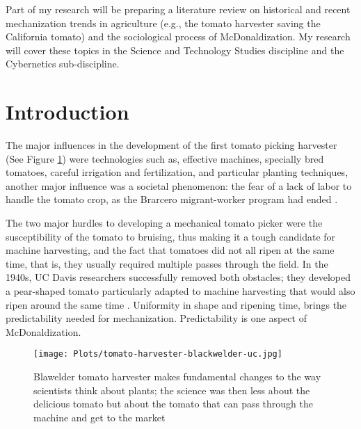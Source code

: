 Part of my research will be preparing a literature review on historical and recent mechanization trends in agriculture (e.g., the tomato harvester saving the California tomato) and the sociological process of McDonaldization. My research will cover these topics in the Science and Technology Studies discipline and the Cybernetics sub-discipline.

\section{Introduction} 
The major influences in the development of the first tomato picking harvester (See Figure \ref{fig:tomatoharvester}) were technologies such as, effective machines, specially bred tomatoes, careful irrigation and fertilization, and particular planting techniques, another major influence was a societal phenomenon: the fear of a lack of labor to handle the tomato crop, as the Brarcero migrant-worker program had ended \cite{rasmussen1968advances}. 

The two major hurdles to developing a mechanical tomato picker were the susceptibility of the tomato to bruising, thus making it a tough candidate for machine harvesting, and the fact that tomatoes did not all ripen at the same time, that is, they usually required multiple passes through the field. In the 1940s, UC Davis researchers successfully removed both obstacles; they developed a pear-shaped tomato particularly adapted to machine harvesting that would also ripen around the same time \cite{rasmussen1968advances}. Uniformity in shape and ripening time, brings the predictability needed for mechanization. Predictability is one aspect of McDonaldization. 


\begin{figure}[ht]
	\centering
	\texttt{[image: Plots/tomato-harvester-blackwelder-uc.jpg]}
	\caption{Blawelder tomato harvester makes fundamental changes to the way scientists think about plants; the science was then less about the delicious tomato but about the tomato that can pass through the machine and get to the market \protect{}} 
	\label{fig:tomatoharvester}
\end{figure}

